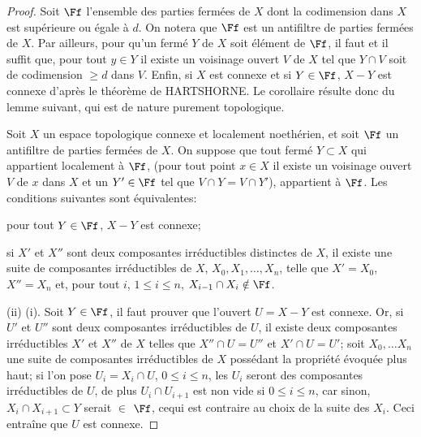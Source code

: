 \begin{proof}
Soit $\Ff$ l'ensemble des parties ferm\'ees de $X$ dont la codimension dans $X$ est sup\'erieure ou \'egale \`a $d$. On notera que $\Ff$ est un antifiltre de parties ferm\'ees de $X$. Par ailleurs, pour qu'un ferm\'e $Y$ de $X$ soit \'el\'ement de $\Ff$, il faut et il suffit que, pour tout $y\in Y$ il existe un voisinage ouvert $V$ de $X$ tel que $Y\cap V$ soit de codimension $\geq d$ dans $V$. Enfin, si $X$ est connexe et si $Y\in \Ff$, $X-Y$ est connexe d'apr\`es le th\'eor\`eme de HARTSHORNE. Le corollaire r\'esulte donc du lemme suivant, qui est de nature purement topologique.

\begin{lemme} \label{III.3.8}
Soit $X$ un espace topologique connexe et localement noeth\'erien, et soit $\Ff$ un antifiltre de parties ferm\'ees de $X$. On suppose que tout ferm\'e $Y\subset X$ qui appartient localement \`a $\Ff$, (\ie pour tout point $x\in X$ il existe un voisinage ouvert $V$ de $x$ dans $X$ et un $Y'\in \Ff$ tel que $V\cap Y=V\cap Y'$), appartient \`a $\Ff$. Les conditions suivantes sont \'equivalentes:
\begin{enumeratei}

\item
pour tout $Y\in \Ff$, $X-Y$ est connexe;

\item
si $X'$ et $X''$ sont deux composantes irr\'eductibles distinctes de $X$, il existe une suite de composantes irr\'eductibles de $X$, $X_0, X_1, \ldots, X_n$, telle que $X'=X_0$, $X''=X_n$ et, pour tout $i$, $1\leq i\leq n$, $X_{i-1} \cap X_i \notin \Ff$.
\end{enumeratei}
\end{lemme}

(ii) \ALORS (i). Soit $Y\in \Ff$, il faut prouver que l'ouvert $U=X-Y$ est connexe. Or, si $U'$ et $U''$ sont deux composantes irr\'eductibles de $U$, il existe deux composantes irr\'eductibles $X'$ et $X''$ de $X$ telles que $X''\cap U=U''$ et $X'\cap U=U'$; soit $X_0, \ldots X_n$ une suite de composantes irr\'eductibles de $X$ poss\'edant la propri\'et\'e \'evoqu\'ee plus haut; si l'on pose $U_i=X_i\cap U$, $0\leq i\leq n$, les $U_i$ seront des composantes irr\'eductibles de $U$, de plus $U_{i}\cap U_{i+1}$ est non vide si $0\leq i\leq n$, car sinon, {$X_{i}\cap X_{i+1} \subset Y$} serait $\in$ $\Ff$, ce\pageoriginaled qui est contraire au choix de la suite des $X_i$. Ceci entra\^ine que $U$ est connexe.


\end{proof}
